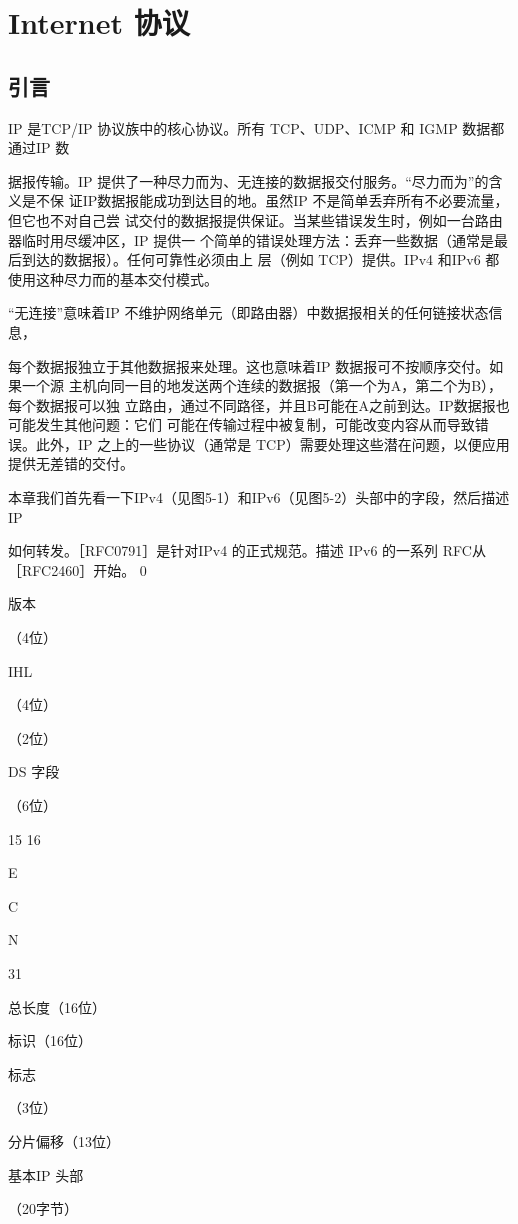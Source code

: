 \chapter{Internet 协议}
\section{引言}
IP 是TCP/IP 协议族中的核心协议。所有 TCP、UDP、ICMP 和 IGMP 数据都通过IP 数

据报传输。IP 提供了一种尽力而为、无连接的数据报交付服务。“尽力而为”的含义是不保
证IP数据报能成功到达目的地。虽然IP 不是简单丢弃所有不必要流量，但它也不对自己尝
试交付的数据报提供保证。当某些错误发生时，例如一台路由器临时用尽缓冲区，IP 提供一
个简单的错误处理方法：丢弃一些数据（通常是最后到达的数据报）。任何可靠性必须由上
层（例如 TCP）提供。IPv4 和IPv6 都使用这种尽力而的基本交付模式。

“无连接”意味着IP 不维护网络单元（即路由器）中数据报相关的任何链接状态信息，

每个数据报独立于其他数据报来处理。这也意味着IP 数据报可不按顺序交付。如果一个源
主机向同一目的地发送两个连续的数据报（第一个为A，第二个为B），每个数据报可以独
立路由，通过不同路径，并且B可能在A之前到达。IP数据报也可能发生其他问题：它们
可能在传输过程中被复制，可能改变内容从而导致错误。此外，IP 之上的一些协议（通常是
TCP）需要处理这些潜在问题，以便应用提供无差错的交付。

本章我们首先看一下IPv4（见图5-1）和IPv6（见图5-2）头部中的字段，然后描述IP

如何转发。［RFC0791］是针对IPv4 的正式规范。描述 IPv6 的一系列 RFC从［RFC2460］开始。
0

版本

（4位）

IHL

（4位）

（2位）

DS 字段

（6位）

15 16

E

C

N

31

总长度（16位）

标识（16位）

标志

（3位）

分片偏移（13位）

基本IP 头部

（20字节）

